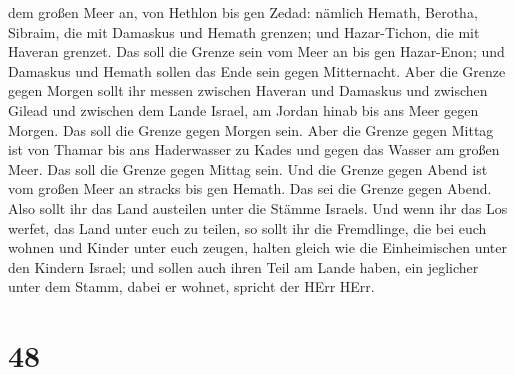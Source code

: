 dem großen Meer an, von Hethlon bis gen Zedad:  nämlich
Hemath, Berotha, Sibraim, die mit Damaskus und Hemath grenzen; und
Hazar-Tichon, die mit Haveran grenzet.  Das soll die Grenze
sein vom Meer an bis gen Hazar-Enon; und Damaskus und Hemath sollen das
Ende sein gegen Mitternacht.  Aber die Grenze gegen Morgen
sollt ihr messen zwischen Haveran und Damaskus und zwischen Gilead und
zwischen dem Lande Israel, am Jordan hinab bis ans Meer gegen Morgen.
Das soll die Grenze gegen Morgen sein.  Aber die Grenze
gegen Mittag ist von Thamar bis ans Haderwasser zu Kades und gegen das
Wasser am großen Meer. Das soll die Grenze gegen Mittag sein.
 Und die Grenze gegen Abend ist vom großen Meer an stracks
bis gen Hemath. Das sei die Grenze gegen Abend.  Also sollt
ihr das Land austeilen unter die Stämme Israels.  Und wenn
ihr das Los werfet, das Land unter euch zu teilen, so sollt ihr die
Fremdlinge, die bei euch wohnen und Kinder unter euch zeugen, halten
gleich wie die Einheimischen unter den Kindern Israel;  und
sollen auch ihren Teil am Lande haben, ein jeglicher unter dem Stamm,
dabei er wohnet, spricht der HErr HErr.

\hypertarget{section-47}{%
\section{48}\label{section-47}}

